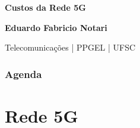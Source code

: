 \documentclass[t]{beamer}
\begin{document}
	
	{
		\begin{frame}[plain]
			\vspace{18mm}
			\begin{flushright}
				\textcolor{cinza}{\textbf{\huge{
							Custos da Rede 5G
				}}}
			\end{flushright}
			
			\vspace{-6mm}
			\begin{flushright}
				\textcolor{cinza}{\textbf{\scriptsize{
							Eduardo Fabricio Notari
				}}}
			\end{flushright}
			
			\vspace{-7mm}
			\begin{flushright}
				\textcolor{cinza}{\scriptsize{
						Telecomunicações | PPGEL | UFSC
				}}
			\end{flushright}
			
			
		\end{frame}
	}
	
\begin{frame}
	\frametitle{Agenda}
	\small
	\tableofcontents
\end{frame}

\section{Rede 5G}
\end{document}
